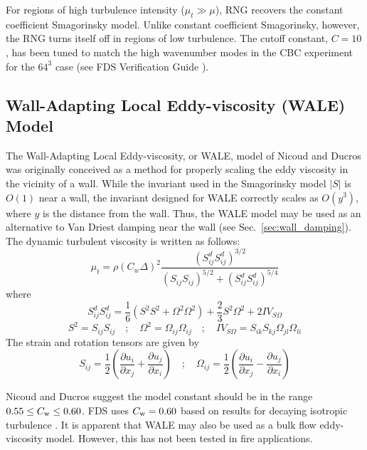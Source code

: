 For regions of high turbulence intensity ($\mu_t \gg \mu$), RNG recovers the constant coefficient Smagorinsky model.  Unlike constant coefficient Smagorinsky, however, the RNG turns itself off in regions of low turbulence.  The cutoff constant, $C=10$, has been tuned to match the high wavenumber modes in the CBC experiment for the $64^3$ case (see FDS Verification Guide \cite{FDS_Verification_Guide}).

\subsection{Wall-Adapting Local Eddy-viscosity (WALE) Model}
\label{sec:wale}

The Wall-Adapting Local Eddy-viscosity, or WALE, model of Nicoud and Ducros \cite{Nicoud:1999} was originally conceived as a method for properly scaling the eddy viscosity in the vicinity of a wall.  While the invariant used in the Smagorinsky model $|S|$ is $O(1)$ near a wall, the invariant designed for WALE correctly scales as $O(y^3)$, where $y$ is the distance from the wall.  Thus, the WALE model may be used as an alternative to Van Driest damping near the wall (see Sec.~\ref{sec:wall_damping}).  The dynamic turbulent viscosity is written as follows:
\begin{equation}
\label{eq:wale}
\mu_{\si{t}} = \rho (C_{\si{w}} \Delta)^2 \frac{(S^d_{ij} S^d_{ij})^{3/2}}{(S_{ij} S_{ij})^{5/2} + (S^d_{ij} S^d_{ij})^{5/4}}
\end{equation}
where
\begin{equation}
S^d_{ij} S^d_{ij} = \frac{1}{6} \left(S^2 S^2 + \Omega^2 \Omega^2\right) + \frac{2}{3} S^2 \Omega^2 + 2 {IV}_{S\Omega}
\end{equation}
\begin{equation*}
S^2 = S_{ij} S_{ij} \quad ; \quad \Omega^2 = \Omega_{ij} \Omega_{ij} \quad ; \quad {IV}_{S\Omega} = S_{ik}S_{kj}\Omega_{jl}\Omega_{li}
\end{equation*}
The strain and rotation tensors are given by
\begin{equation}
S_{ij} = \frac{1}{2} \left( \frac{\partial u_i}{\partial x_j} + \frac{\partial u_j}{\partial x_i} \right) \quad ; \quad \Omega_{ij} = \frac{1}{2} \left( \frac{\partial u_i}{\partial x_j} - \frac{\partial u_j}{\partial x_i} \right)
\end{equation}

Nicoud and Ducros \cite{Nicoud:1999} suggest the model constant should be in the range $0.55 \le C_{\rm w} \le 0.60$.  FDS uses $C_{\rm w} = 0.60$ based on results for decaying isotropic turbulence \cite{FDS_Verification_Guide}.  It is apparent that WALE may also be used as a bulk flow eddy-viscosity model.  However, this has not been tested in fire applications.

